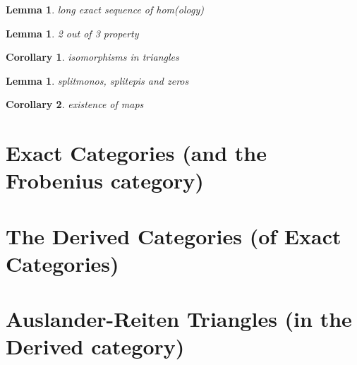 \documentclass[12pt]{article}
\newtheorem{corollary}{Corollary}[theorem]
\newtheorem{lemma}[theorem]{Lemma}
\theoremstyle{definition}
\theoremstyle{remark}
\begin{document}
        \begin{lemma}
            long exact sequence of hom(ology)
        \end{lemma}

        \begin{lemma}
            2 out of 3 property
        \end{lemma}

        \begin{corollary}
            isomorphisms in triangles
        \end{corollary}

        \begin{lemma}
            splitmonos, splitepis and zeros
        \end{lemma}

        \begin{corollary}
            existence of maps
        \end{corollary}
    \section{Exact Categories (and the Frobenius category)}
    \section{The Derived Categories (of Exact Categories)}
    \section{Auslander-Reiten Triangles (in the Derived category)}
\end{document}
